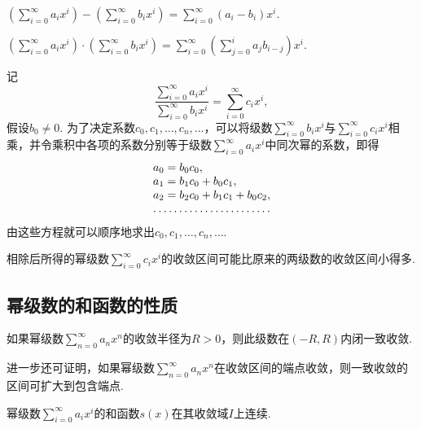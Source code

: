 \begin{definition}[幂级数的减法]
\(\left(\sum\limits_{i=0}^\infty a_i x^i\right)
- \left(\sum\limits_{i=0}^\infty b_i x^i\right)
= \sum\limits_{i=0}^\infty (a_i-b_i) x^i\).
\end{definition}

\begin{definition}[幂级数的乘法]
\(\left(\sum\limits_{i=0}^\infty a_i x^i\right)
\cdot \left(\sum\limits_{i=0}^\infty b_i x^i\right)
= \sum\limits_{i=0}^\infty \left(
	\sum\limits_{j=0}^{i} a_j b_{i-j}
\right) x^i\).
\end{definition}

\begin{definition}[幂级数的除法]
记\[
\frac{
	\sum\limits_{i=0}^\infty a_i x^i
}{
	\sum\limits_{i=0}^\infty b_i x^i
}
= \sum\limits_{i=0}^\infty c_i x^i,
\]假设\(b_0 \neq 0\).
为了决定系数\(c_0,c_1,\dotsc,c_n,\dotsc\)，可以将级数\(\sum\limits_{i=0}^\infty b_i x^i\)与\(\sum\limits_{i=0}^\infty c_i x^i\)相乘，并令乘积中各项的系数分别等于级数\(\sum\limits_{i=0}^\infty a_i x^i\)中同次幂的系数，即得\[
\begin{array}{l}
a_0 = b_0 c_0, \\
a_1 = b_1 c_0 + b_0 c_1, \\
a_2 = b_2 c_0 + b_1 c_1 + b_0 c_2, \\
\hdotsfor{1} \\
\end{array}
\]由这些方程就可以顺序地求出\(c_0,c_1,\dotsc,c_n,\dotsc\).

相除后所得的幂级数\(\sum\limits_{i=0}^\infty c_i x^i\)的收敛区间可能比原来的两级数的收敛区间小得多.
\end{definition}

\subsection{幂级数的和函数的性质}
\begin{property}\label{theorem:无穷级数.一致收敛的幂级数的性质}
\def\s{\sum\limits_{n=0}^\infty }
如果幂级数\(\s a_n x^n\)的收敛半径为\(R>0\)，则此级数在\((-R,R)\)内闭一致收敛.
\end{property}
进一步还可证明，如果幂级数\(\sum\limits_{n=0}^\infty a_n x^n\)在收敛区间的端点收敛，则一致收敛的区间可扩大到包含端点.

\begin{property}\label{theorem:无穷级数.幂级数的和函数的性质1}
幂级数\(\sum\limits_{i=0}^\infty a_i x^i\)的和函数\(s(x)\)在其收敛域\(I\)上连续.
\end{property}

